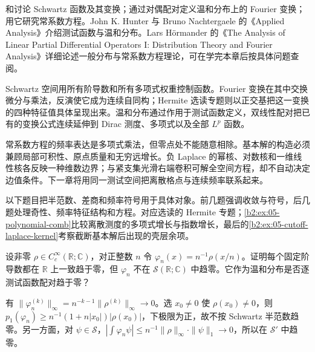 \ProseParagraphBreak

和讨论 Schwartz 函数及其变换；通过对偶配对定义温和分布上的 Fourier 变换；用它研究常系数方程。John K. Hunter 与 Bruno Nachtergaele 的《Applied Analysis》\cite[Chapter 11]{Hunter2001Applied}介绍测试函数与温和分布。Lars Hörmander 的《The Analysis of Linear Partial Differential Operators I: Distribution Theory and Fourier Analysis》\cite{Hrmander2003Analysis}详细论述一般分布与常系数方程理论，可在学完本章后按具体问题查阅。






\begin{chaptersummary}
Schwartz 空间用所有阶导数和所有多项式权重控制函数。Fourier 变换在其中交换微分与乘法，反演使它成为连续自同构；Hermite 选读专题则以正交基把这一变换的四种特征值具体呈现出来。温和分布通过作用于测试函数定义，双线性配对把已有的变换公式连续延伸到 Dirac 测度、多项式以及全部 \(L^p\) 函数。

\ProseParagraphBreak

常系数方程的频率表达是多项式乘法，但零点处不能随意相除。基本解的构造必须兼顾局部可积性、原点质量和无穷远增长。负 Laplace 的幂核、对数核和一维线性核各反映一种维数边界；与紧支集光滑右端卷积可解全空间方程，却不自动决定边值条件。下一章将用同一测试空间把离散格点与连续频率联系起来。
\end{chaptersummary}

\BookExercises

以下题目把半范数、差商和频率符号用于具体对象。前几题强调收敛与符号，后几题处理奇性、频率特征结构和方程。对应选读的 Hermite 专题；\cref{b2:ex:05-polynomial-comb}比较离散测度的多项式增长与指数增长，最后的\cref{b2:ex:05-cutoff-laplace-kernel}考察截断基本解后出现的壳层余项。

\begin{exercise}\label{b2:ex:05-schwartz-convergence}
设非零 \(\rho\in C_c^\infty(\mathbb R;\mathbb C)\)，对正整数 \(n\) 令 \(\varphi_n(x)=n^{-1}\rho(x/n)\)。证明每个固定阶导数都在 \(\mathbb R\) 上一致趋于零，但 \(\varphi_n\) 不在 \(\mathcal S(\mathbb R;\mathbb C)\) 中趋零。它作为温和分布是否逐测试函数配对趋于零？
\end{exercise}
\begin{solution}
有 \(\|\varphi_n^{(k)}\|_\infty=n^{-k-1}\|\rho^{(k)}\|_\infty\to0\)。选 \(x_0\ne0\) 使 \(\rho(x_0)\ne0\)，则 \(p_1(\varphi_n)\geq n^{-1}(1+n|x_0|)|\rho(x_0)|\)，下极限为正，故不按 Schwartz 半范数趋零。另一方面，对 \(\psi\in\mathcal S\)，\(|\int\varphi_n\psi|\leq n^{-1}\|\rho\|_\infty\cdot\|\psi\|_1\to0\)，所以在 \(\mathcal S'\) 中趋零。
\end{solution}

